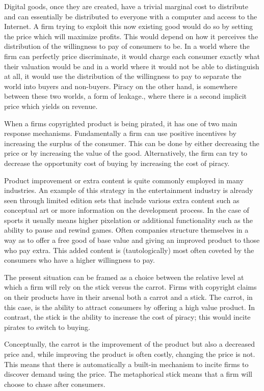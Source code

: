 \documentclass{article}
\begin{document}
Digital goods, once they are created, have a trivial marginal cost to distribute and can essentially be distributed to everyone with a computer and access to the Internet. A firm trying to exploit this now existing good would do so by setting the price which will maximize profits. This would depend on how it perceives the distribution of the willingness to pay of consumers to be. In a world where the firm can perfectly price discriminate, it would charge each consumer exactly what their valuation would be and in a world where it would not be able to distinguish at all, it would use the distribution of the willingness to pay to separate the world into buyers and non-buyers. Piracy on the other hand, is somewhere between these two worlds, a form of leakage., where there is a second implicit price which yields on revenue. 

When a firms copyrighted product is being pirated, it has one of two main response mechanisms. Fundamentally a firm can use positive incentives by increasing the surplus of the consumer. This can be done by either decreasing the price or by increasing the value of the good. Alternatively, the firm can try to decrease the opportunity cost of buying by increasing the cost of piracy.  

Product improvement or extra content is quite commonly employed in many industries. An example of this strategy in the entertainment industry is already seen through limited edition sets that include various extra content such as conceptual art or more information on the development process. In the case of sports it usually means higher pixelation or additional functionality such as the ability to pause and rewind games. Often companies structure themselves in a way as to offer a free good of base value and giving an improved product to those who pay extra. This added content is (tautologically) most often coveted by the consumers who have a higher willingness to pay.

The present situation can be framed as a choice between the relative level at which a firm will rely on the stick versus the carrot. Firms with copyright claims on their products have in their arsenal both a carrot and a stick. The carrot, in this case, is the ability to attract consumers by offering a high value product. In contrast, the stick is the ability to increase the cost of piracy; this would incite pirates to switch to buying. 

Conceptually, the carrot is the improvement of the product but also a decreased price and, while improving the product is often costly, changing the price is not. This means that there is automatically a built-in mechanism to incite firms to discover demand using the price. The metaphorical stick means that a firm will choose to chase after consumers. 
\end{document}
